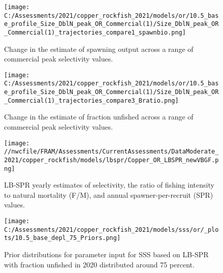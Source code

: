 \documentclass[11pt,
  english,
  a4paper,
]{article}
\begin{document}
\begin{figure}
\centering
\texttt{[image: C:/Assessments/2021/copper\_rockfish\_2021/models/or/10.5\_base\_profile\_Size\_DblN\_peak\_OR\_Commercial(1)/Size\_DblN\_peak\_OR\_Commercial(1)\_trajectories\_compare1\_spawnbio.png]}
\caption{Change in the estimate of spawning output across a range of commercial peak selectivity values.\label{fig:selex-ssb}}
\end{figure}

\tagmcend\tagstructend


\begin{figure}
\centering
\texttt{[image: C:/Assessments/2021/copper\_rockfish\_2021/models/or/10.5\_base\_profile\_Size\_DblN\_peak\_OR\_Commercial(1)/Size\_DblN\_peak\_OR\_Commercial(1)\_trajectories\_compare3\_Bratio.png]}
\caption{Change in the estimate of fraction unfished across a range of commercial peak selectivity values.\label{fig:selex-depl}}
\end{figure}

\tagmcend\tagstructend

\newpage


\begin{figure}
\centering
\texttt{[image: //nwcfile/FRAM/Assessments/CurrentAssessments/DataModerate\_2021/copper\_rockfish/models/lbspr/Copper\_OR\_LBSPR\_newVBGF.png]}
\caption{LB-SPR yearly estimates of selectivity, the ratio of fishing intensity to natural mortality (F/M), and annual spawner-per-recruit (SPR) values.\label{fig:lbspr}}
\end{figure}

\tagmcend\tagstructend

\newpage


\begin{figure}
\centering
\texttt{[image: C:/Assessments/2021/copper\_rockfish\_2021/models/sss/or/\_plots/10.5\_base\_depl\_75\_Priors.png]}
\caption{Prior distributions for parameter input for SSS based on LB-SPR with fraction unfished in 2020 distributed around 75 percent.\label{fig:sss-prior-75}}
\end{figure}
\end{document}
